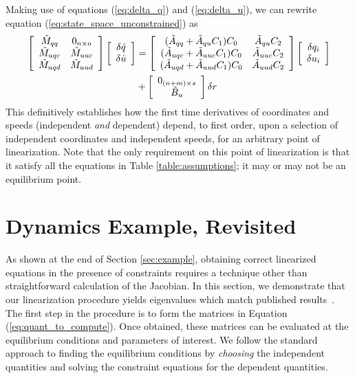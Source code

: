 Making use of equations (\ref{eq:delta_q}) and (\ref{eq:delta_u}), we can
rewrite equation (\ref{eq:state_space_unconstrained}) as
\begin{align}
  \label{eq:state_space_constrained}
  \left[
    \begin{array}{cc}
      \tilde{M}_{qq} & 0_{n \times o} \\
      \tilde{M}_{uqc} & \tilde{M}_{uuc} \\
      \tilde{M}_{uqd} & \tilde{M}_{uud}
    \end{array}
    \right]
    \left[
      \begin{array}{c}
        \delta \dot{q} \\
        \delta \dot{u}
      \end{array}
    \right]
   &=
   \left[
     \begin{array}{cc}
       (\tilde{A}_{qq} + \tilde{A}_{qu} C_1 ) C_0 & \tilde{A}_{qu} C_2 \\
       (\tilde{A}_{uqc} + \tilde{A}_{uuc} C_1 ) C_0 & \tilde{A}_{uuc} C_2\\
       (\tilde{A}_{uqd} + \tilde{A}_{uud} C_1 ) C_0 & \tilde{A}_{uud} C_2
     \end{array}
   \right]
    \left[
      \begin{array}{c}
        \delta q_i \\
        \delta u_i
      \end{array}
    \right]
    \notag \\
    &+\left[
      \begin{array}{c}
        0_{(n+m) \times s} \\
        \tilde{B}_{u}
      \end{array}
    \right]
    \delta r
\end{align}
This definitively establishes how the first time derivatives of coordinates and
speeds (independent \textit{and} dependent) depend, to first order, upon a
selection of independent coordinates and independent speeds, for an arbitrary
point of linearization. Note that the only requirement on this point of
linearization is that it satisfy all the equations in Table
\ref{table:assumptions}; it may or may not be an equilibrium point.

\section{Dynamics Example, Revisited}
\label{sec:example_revisited}
As shown at the end of Section \ref{sec:example}, obtaining correct linearized
equations in the presence of constraints requires a technique other than
straightforward calculation of the Jacobian. In this section, we demonstrate
that our linearization procedure yields eigenvalues which match published
results~\cite{Schwab2003,Kane1985,Neimark1972}. The first step in the procedure
is to form the matrices in Equation (\ref{eq:quant_to_compute}). Once obtained,
these matrices can be evaluated at the equilibrium conditions and parameters of
interest. We follow the standard approach to finding the equilibrium conditions
by \textit{choosing} the independent quantities and solving the constraint
equations for the dependent quantities.

